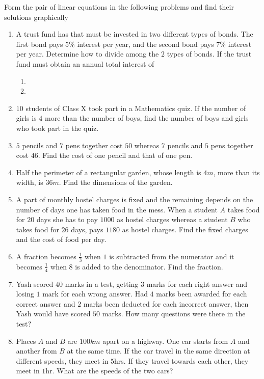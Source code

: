 Form the pair of linear equations in the following problems and find their solutions graphically
\begin{enumerate}[label=\thesubsection.\arabic*, ref=\thesubsection.\theenumi]
\item A trust fund has  that must be invested in two different types of bonds.  The first bond pays $5\%$  interest per year,  and the second bond pays $7\%$ interest per year.   Determine how to divide  among the $2$ types of bonds.  If the trust fund must obtain an annual total interest of
\begin{enumerate}
\item {}
\item {}
\end{enumerate}
\solution
		
\item $10$ students of Class X took part in a Mathematics quiz.  If the number of girls is $4$ more than the number of boys,  find the number of boys and girls who took part in the quiz. 
\item $5$ pencils and $7$ pens together cost \rupee $50$ whereas $7$ pencils and $5$ pens together cost  \rupee $  46$.  Find the cost of one pencil and that of one pen. 
\item Half the perimeter of a rectangular garden,  whose length is $4m$,  more than its width,  is $36m$.  Find the dimensions of the garden. 
\item A part of monthly hostel charges is fixed and the remaining depends on the number of days one has taken food in the mess.  When a student $A$ takes food for $20$ days she has to pay \rupee $1000$ as hostel charges whereas a student $B$ who takes food for $26$ days,  pays \rupee $1180$ as hostel charges.  Find the fixed charges and the cost of food per day. 
\item A fraction becomes $\frac{1}{3}$ when $1$ is subtracted from the numerator and it becomes $\frac{1}{4}$ when $8$ is added to the denominator.  Find the fraction. 
\item Yash scored $40$ marks in a test,  getting $3$ marks for each right answer and losing $1$ mark for each wrong answer.  Had $4$ marks been awarded for each correct answer and $2$ marks been deducted for each incorrect answer,  then Yash would have scored $50$ marks.  How many questions were there in the test?
\item Places $A$ and $B$ are $100km$ apart on a highway.  One car starts from $A$ and another from $B$ at the same time.  If the car travel in the same direction at different speeds,  they meet in $5$hrs.  If they travel towards each other,  they meet in $1$hr.  What are the speeds of the two cars?

\end{enumerate}
